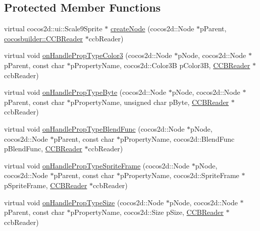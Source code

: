 \subsection*{Protected Member Functions}
\begin{DoxyCompactItemize}
\item 
virtual cocos2d\+::ui\+::\+Scale9\+Sprite $\ast$ \hyperlink{classcocosbuilder_1_1Scale9SpriteLoader_a799422aee813dcb97aa85839c031d2c1}{create\+Node} (cocos2d\+::\+Node $\ast$p\+Parent, \hyperlink{classcocosbuilder_1_1CCBReader}{cocosbuilder\+::\+C\+C\+B\+Reader} $\ast$ccb\+Reader)
\item 
virtual void \hyperlink{classcocosbuilder_1_1Scale9SpriteLoader_a8aa4a2a5de0d51f4a411f08d94a28089}{on\+Handle\+Prop\+Type\+Color3} (cocos2d\+::\+Node $\ast$p\+Node, cocos2d\+::\+Node $\ast$p\+Parent, const char $\ast$p\+Property\+Name, cocos2d\+::\+Color3B p\+Color3B, \hyperlink{classcocosbuilder_1_1CCBReader}{C\+C\+B\+Reader} $\ast$ccb\+Reader)
\item 
virtual void \hyperlink{classcocosbuilder_1_1Scale9SpriteLoader_a858f13bb9a9338d89a6b4915e77350ea}{on\+Handle\+Prop\+Type\+Byte} (cocos2d\+::\+Node $\ast$p\+Node, cocos2d\+::\+Node $\ast$p\+Parent, const char $\ast$p\+Property\+Name, unsigned char p\+Byte, \hyperlink{classcocosbuilder_1_1CCBReader}{C\+C\+B\+Reader} $\ast$ccb\+Reader)
\item 
virtual void \hyperlink{classcocosbuilder_1_1Scale9SpriteLoader_ae54855ef720914b44a394f1586ed3ca0}{on\+Handle\+Prop\+Type\+Blend\+Func} (cocos2d\+::\+Node $\ast$p\+Node, cocos2d\+::\+Node $\ast$p\+Parent, const char $\ast$p\+Property\+Name, cocos2d\+::\+Blend\+Func p\+Blend\+Func, \hyperlink{classcocosbuilder_1_1CCBReader}{C\+C\+B\+Reader} $\ast$ccb\+Reader)
\item 
virtual void \hyperlink{classcocosbuilder_1_1Scale9SpriteLoader_ae076e1a1019be770dbeafbb2e268b188}{on\+Handle\+Prop\+Type\+Sprite\+Frame} (cocos2d\+::\+Node $\ast$p\+Node, cocos2d\+::\+Node $\ast$p\+Parent, const char $\ast$p\+Property\+Name, cocos2d\+::\+Sprite\+Frame $\ast$p\+Sprite\+Frame, \hyperlink{classcocosbuilder_1_1CCBReader}{C\+C\+B\+Reader} $\ast$ccb\+Reader)
\item 
virtual void \hyperlink{classcocosbuilder_1_1Scale9SpriteLoader_a749f9f634d680b8005a3ca9c86873bc9}{on\+Handle\+Prop\+Type\+Size} (cocos2d\+::\+Node $\ast$p\+Node, cocos2d\+::\+Node $\ast$p\+Parent, const char $\ast$p\+Property\+Name, cocos2d\+::\+Size p\+Size, \hyperlink{classcocosbuilder_1_1CCBReader}{C\+C\+B\+Reader} $\ast$ccb\+Reader)
\item 

\end{DoxyCompactItemize}

